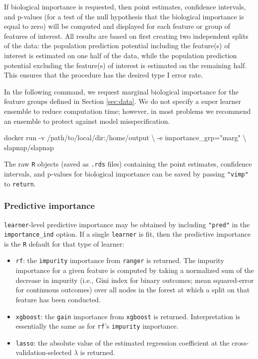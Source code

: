 \documentclass[]{article}
\newenvironment{Shaded}{\begin{snugshade}}{\end{snugshade}}
\newcommand{\StringTok}[1]{\textcolor[rgb]{0.31,0.60,0.02}{#1}}
\newcommand{\ExtensionTok}[1]{#1}
\newcommand{\NormalTok}[1]{#1}
\providecommand{\tightlist}{%
  \setlength{\itemsep}{0pt}\setlength{\parskip}{0pt}}
\begin{document}
If biological importance is requested, then point estimates, confidence
intervals, and p-values (for a test of the null hypothesis that the
biological importance is equal to zero) will be computed and displayed
for each feature or group of features of interest. All results are based
on first creating two independent splits of the data: the population
prediction potential including the feature(s) of interest is estimated
on one half of the data, while the population prediction potential
excluding the feature(s) of interest is estimated on the remaining half.
This ensures that the procedure has the desired type I error rate.

In the following command, we request marginal biological importance for
the feature groups defined in Section \ref{sec:data}. We do not specify
a super learner ensemble to reduce computation time; however, in most
problems we recommend an ensemble to protect against model
misspecification.

\begin{Shaded}
\begin{Highlighting}[]
\ExtensionTok{docker}\NormalTok{ run -v /path/to/local/dir:/home/output \textbackslash{}}
\NormalTok{           -e importance_grp=}\StringTok{"marg"}\NormalTok{ \textbackslash{}}
\NormalTok{           slapnap/slapnap}
\end{Highlighting}
\end{Shaded}

The raw \texttt{R} objects (saved as \texttt{.rds} files) containing the
point estimates, confidence intervals, and p-values for biological
importance can be saved by passing \texttt{"vimp"} to \texttt{return}.

\subsubsection{Predictive importance}\label{predictive-importance}

\texttt{learner}-level predictive importance may be obtained by
including \texttt{"pred"} in the \texttt{importance\_ind} option. If a
single \texttt{learner} is fit, then the predictive importance is the
\texttt{R} default for that type of learner:

\begin{itemize}
\tightlist
\item
  \texttt{rf}: the \texttt{impurity} importance from \texttt{ranger}
  \citep{rangerpkg} is returned. The impurity importance for a given
  feature is computed by taking a normalized sum of the decrease in
  impurity (i.e., Gini index for binary outcomes; mean squared-error for
  continuous outcomes) over all nodes in the forest at which a split on
  that feature has been conducted.
\item
  \texttt{xgboost}: the \texttt{gain} importance from \texttt{xgboost}
  \citep{xgboostpkg} is returned. Interpretation is essentially the same
  as for \texttt{rf}'s \texttt{impurity} importance.
\item
  \texttt{lasso}: the absolute value of the estimated regression
  coefficient at the cross-validation-selected \(\lambda\) is returned.
\end{itemize}
\end{document}
